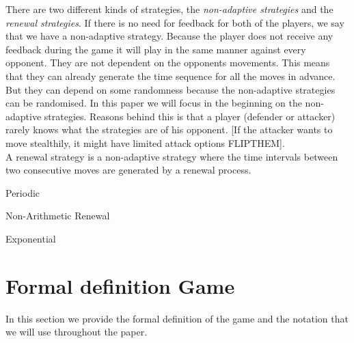 There are two different kinds of strategies, the \textit{non-adaptive strategies} and the \textit{renewal strategies}. If there is no need for feedback for both of the players, we say that we have a non-adaptive strategy. Because the player does not receive any feedback during the game it will play in the same manner against every opponent. They are not dependent on the opponents movements. This means that they can already generate the time sequence for all the moves in advance.  But they can depend on some randomness because the non-adaptive strategies can be randomised. 
In this paper we will focus in the beginning on the non-adaptive strategies. Reasons behind this is that a player (defender or attacker) rarely knows what the strategies are of his opponent. [If the attacker wants to move stealthily, it might have limited attack options FLIPTHEM]. \\
A renewal strategy is a non-adaptive strategy where the time intervals between two consecutive moves are generated by a renewal process. \\

 \begin{description}
 \item Periodic
 \item Non-Arithmetic Renewal
 \item Exponential
 \end{description}

\section{Formal definition Game}

In this section we provide the formal definition of the game and the notation that we will use throughout the paper.

